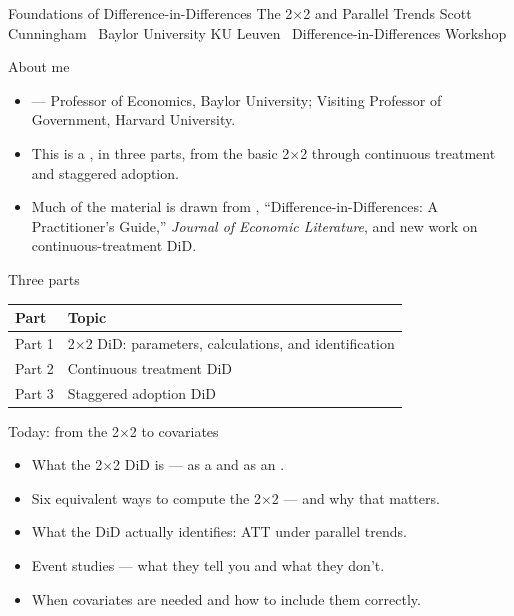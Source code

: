 \documentclass[aspectratio=169,11pt]{beamer}
\begin{document}

\codechellatitle
  {Foundations of Difference-in-Differences}
  {The 2$\times$2 and Parallel Trends}
  {Scott Cunningham \textperiodcentered\ Baylor University}
  {KU Leuven \textperiodcentered\ Difference-in-Differences Workshop}

\begin{frame}{About me}
\vspace{0.4em}
\begin{itemize}\setlength\itemsep{0.6em}
  \item {} --- Professor of Economics, Baylor University; Visiting Professor of Government, Harvard University.
  \item This is a , in three parts, from the basic 2$\times$2 through continuous treatment and staggered adoption.
  \item Much of the material is drawn from , ``Difference-in-Differences: A Practitioner's Guide,'' \textit{Journal of Economic Literature}, and new work on continuous-treatment DiD.
\end{itemize}
\end{frame}

\begin{frame}{Three parts}
\vspace{0.4em}
\begin{center}
\renewcommand{\arraystretch}{1.6}
\small
\begin{tabular}{@{}lp{8.4cm}@{}}
\toprule
\textbf{Part} & \textbf{Topic} \\
\midrule
Part 1 & 2$\times$2 DiD: parameters, calculations, and identification \\
Part 2 & Continuous treatment DiD \\
Part 3 & Staggered adoption DiD \\
\bottomrule
\end{tabular}
\end{center}
\end{frame}

\begin{frame}{Today: from the 2$\times$2 to covariates}
\vspace{0.4em}
\begin{itemize}\setlength\itemsep{0.5em}
  \item What the 2$\times$2 DiD is --- as a  and as an .
  \item Six equivalent ways to compute the 2$\times$2 --- and why that matters.
  \item What the DiD actually identifies: ATT under parallel trends.
  \item Event studies --- what they tell you and what they don't.
  \item When covariates are needed and how to include them correctly.
\end{itemize}
\end{frame}
\end{document}
